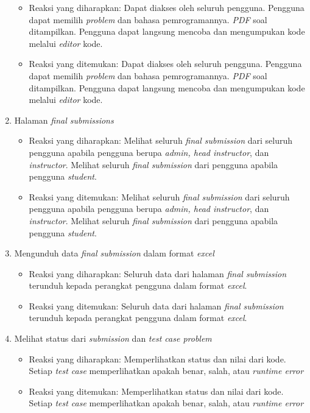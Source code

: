 \begin{enumerate}
	 \begin{itemize}
	 	\item Reaksi yang diharapkan: Dapat diakses oleh seluruh pengguna. Pengguna dapat memilih \textit{problem} dan bahasa pemrogramannya. \textit{PDF} soal ditampilkan. Pengguna dapat langsung mencoba dan mengumpukan kode melalui \textit{editor} kode.
	 	\item Reaksi yang ditemukan: Dapat diakses oleh seluruh pengguna. Pengguna dapat memilih \textit{problem} dan bahasa pemrogramannya. \textit{PDF} soal ditampilkan. Pengguna dapat langsung mencoba dan mengumpukan kode melalui \textit{editor} kode.
	 \end{itemize}
	 \item Halaman \textit{final submissions}
	 \begin{itemize}
	 	\item Reaksi yang diharapkan: Melihat seluruh \textit{final submission} dari seluruh pengguna apabila pengguna berupa \textit{admin, head instructor}, dan \textit{instructor}. Melihat seluruh \textit{final submission} dari pengguna apabila pengguna \textit{student}.
	 	\item Reaksi yang ditemukan: Melihat seluruh \textit{final submission} dari seluruh pengguna apabila pengguna berupa \textit{admin, head instructor}, dan \textit{instructor}. Melihat seluruh \textit{final submission} dari pengguna apabila pengguna \textit{student}.
	 \end{itemize}
	 \item Mengunduh data \textit{final submission} dalam format \textit{excel}
	 \begin{itemize}
	 	\item Reaksi yang diharapkan: Seluruh data dari halaman \textit{final submission} terunduh kepada perangkat pengguna dalam format \textit{excel}.
	 	\item Reaksi yang ditemukan: Seluruh data dari halaman \textit{final submission} terunduh kepada perangkat pengguna dalam format \textit{excel}.
	 \end{itemize}
	 \item Melihat status dari \textit{submission} dan \textit{test case problem}
	 \begin{itemize}
	 	\item Reaksi yang diharapkan: Memperlihatkan status dan nilai dari kode. Setiap \textit{test case} memperlihatkan apakah benar, salah, atau \textit{runtime error}
	 	\item Reaksi yang ditemukan: Memperlihatkan status dan nilai dari kode. Setiap \textit{test case} memperlihatkan apakah benar, salah, atau \textit{runtime error}

\end{itemize}
\end{enumerate}
